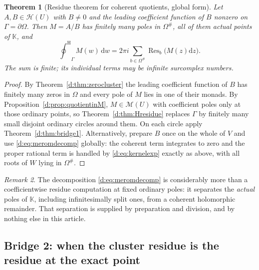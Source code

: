 \documentclass[11pt,a4paper]{article}
\numberwithin{equation}{section}
\newtheorem{theorem}{Theorem}[section]
\theoremstyle{definition}
\theoremstyle{remark}
\newtheorem{remark}[theorem]{Remark}
\theoremstyle{plain}
\newcommand{\K}{\mathbb K}
\newcommand{\halo}[1]{#1^{\#}}
\newcommand{\Hc}{\mathcal H}
\newcommand{\Mc}{\mathcal M}
\newcommand{\ointH}{{\oint^{\mathrm H}}}
\DeclareMathOperator{\Res}{Res}                 %
\newcommand{\Resat}[1]{\Res_{#1}}               %
\newcommand{\dd}{\mathrm d}
\begin{document}
\begin{theorem}[Residue theorem for coherent quotients, global form]
\label{d:thm:residuequotient}
Let $A,B\in\Hc(U)$ with $B\ne0$ and the leading coefficient function of
$B$ nonzero on $\Gamma=\partial\Omega$.  Then $M=A/B$ has finitely many
poles in $\halo\Omega$, all of them actual points of $\K$, and
\begin{equation}\label{d:eq:residuequotient}
 \ointH_{\Gamma}M(w)\,\dd w
  =2\pi i\sum_{b\in\halo\Omega}\Resat{b}\bigl(M(z)\dd z\bigr).
\end{equation}
The sum is finite; its individual terms may be infinite surcomplex
numbers.
\end{theorem}

\begin{proof}
By Theorem~\ref{d:thm:zerocluster} the leading coefficient function of
$B$ has finitely many zeros in $\Omega$ and every pole of $M$ lies in
one of their monads.  By Proposition~\ref{d:prop:quotientinM},
$M\in\Mc(U)$ with coefficient poles only at those ordinary points, so
Theorem~\ref{d:thm:Hresidue} replaces $\Gamma$ by finitely many small
disjoint ordinary circles around them.  On each circle apply
Theorem~\ref{d:thm:bridge1}.  Alternatively, prepare $B$ once on the
whole of $V$ and use \eqref{d:eq:meromdecomp} globally: the coherent
term integrates to zero and the proper rational term is handled by
\eqref{d:eq:kernelexp} exactly as above, with all roots of $W$ lying in
$\halo\Omega$.
\end{proof}

\begin{remark}
The decomposition \eqref{d:eq:meromdecomp} is considerably more than a
coefficientwise residue computation at fixed ordinary poles: it
separates the \emph{actual} poles of $\K$, including infinitesimally
split ones, from a coherent holomorphic remainder.  That separation is
supplied by preparation and division, and by nothing else in this
article.
\end{remark}

\subsection{Bridge 2: when the cluster residue is the residue at the exact point}
\label{d:sub:bridge2}
\end{document}
